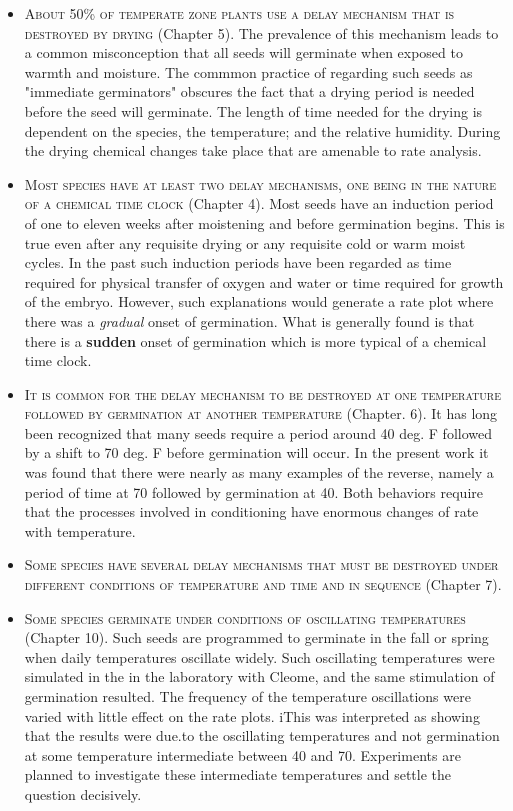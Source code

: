 \begin{itemize}
\item \textsc{About 50\% of temperate zone plants use a delay
mechanism that is destroyed by drying} (Chapter 5). The prevalence
of this mechanism leads to a common misconception that all seeds will germinate
when exposed to warmth and moisture. The commmon practice of regarding such
seeds as "immediate germinators" obscures the fact that a drying period is needed
before the seed will germinate. The length of time needed for the drying is dependent
on the species, the temperature; and the relative humidity. During the drying chemical
changes take place that are amenable to rate analysis.

\item \textsc{Most species have at least two delay mechanisms,
one being in the nature of a chemical time clock} (Chapter 4).
Most seeds have an induction period of one to eleven weeks after moistening and
before germination begins. This is true even after any requisite drying or any requisite
cold or warm moist cycles. In the past such induction periods have been regarded as
time required for physical transfer of oxygen and water or time required for growth of
the embryo. However, such explanations would generate a rate plot where there was
a \textit{gradual} onset of germination. What is generally found is that there is a \textbf{sudden} onset
of germination which is more typical of a chemical time clock.

\item \textsc{It is common for the delay mechanism to be
destroyed at one temperature followed by germination at
another temperature} (Chapter. 6). It has long been recognized that many
seeds require a period around 40 deg. F followed by a shift to 70 deg. F before
germination will occur. In the present work it was found that there were nearly as many
examples of the reverse, namely a period of time at 70 followed by germination at 40.
Both behaviors require that the processes involved in conditioning have enormous
changes of rate with temperature.

\item \textsc{Some species have several delay mechanisms that
must be destroyed under different conditions of
temperature and time and in sequence} (Chapter 7).

\item \textsc{Some species germinate under conditions of
oscillating temperatures} (Chapter 10). Such seeds are programmed to
germinate in the fall or spring when daily temperatures oscillate widely. Such
oscillating temperatures were simulated in the in the laboratory with Cleome, and the
same stimulation of germination resulted. The frequency of the temperature
oscillations were varied with little effect on the rate plots. iThis was interpreted as
showing that the results were due.to the oscillating temperatures and not germination
at some temperature intermediate between 40 and 70. Experiments are planned to
investigate these intermediate temperatures and settle the question decisively.


\end{itemize}
